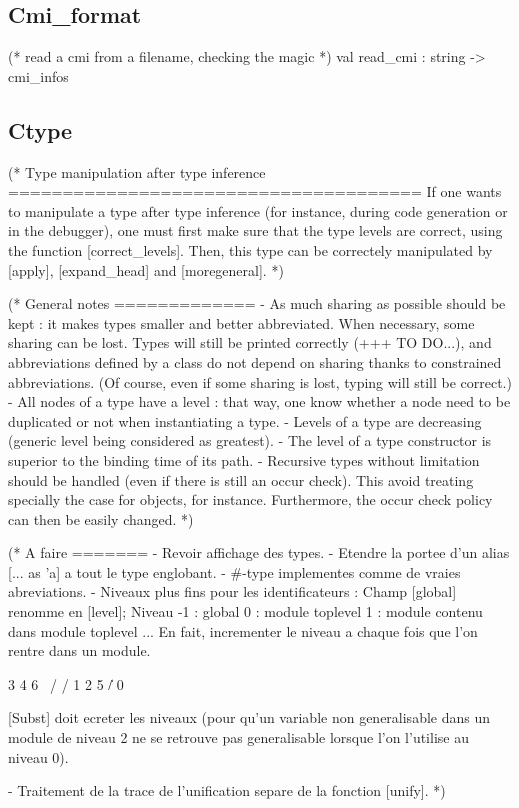 \subsection{Cmi\_format}

\begin{ocamlcode}
(* read a cmi from a filename, checking the magic *)
val read_cmi : string -> cmi_infos
\end{ocamlcode}

\subsection{Ctype}

\begin{ocamlcode}
(*
   Type manipulation after type inference
   ======================================
   If one wants to manipulate a type after type inference (for
   instance, during code generation or in the debugger), one must
   first make sure that the type levels are correct, using the
   function [correct_levels]. Then, this type can be correctely
   manipulated by [apply], [expand_head] and [moregeneral].
*)

(*
   General notes
   =============
   - As much sharing as possible should be kept : it makes types
     smaller and better abbreviated.
     When necessary, some sharing can be lost. Types will still be
     printed correctly (+++ TO DO...), and abbreviations defined by a
     class do not depend on sharing thanks to constrained
     abbreviations. (Of course, even if some sharing is lost, typing
     will still be correct.)
   - All nodes of a type have a level : that way, one know whether a
     node need to be duplicated or not when instantiating a type.
   - Levels of a type are decreasing (generic level being considered
     as greatest).
   - The level of a type constructor is superior to the binding
     time of its path.
   - Recursive types without limitation should be handled (even if
     there is still an occur check). This avoid treating specially the
     case for objects, for instance. Furthermore, the occur check
     policy can then be easily changed.
*)

(*
   A faire
   =======
   - Revoir affichage des types.
   - Etendre la portee d'un alias [... as 'a] a tout le type englobant.
   - #-type implementes comme de vraies abreviations.
   - Niveaux plus fins pour les identificateurs :
       Champ [global] renomme en [level];
       Niveau -1 : global
               0 : module toplevel
               1 : module contenu dans module toplevel
              ...
     En fait, incrementer le niveau a chaque fois que l'on rentre dans
     un module.

       3   4 6
        \ / /
       1 2 5
        \|/
         0

     [Subst] doit ecreter les niveaux (pour qu'un variable non
     generalisable dans un module de niveau 2 ne se retrouve pas
     generalisable lorsque l'on l'utilise au niveau 0).

   - Traitement de la trace de l'unification separe de la fonction
     [unify].
*)
\end{ocamlcode}


